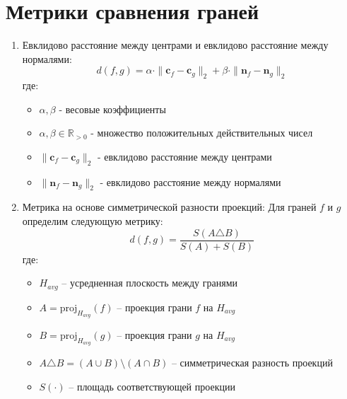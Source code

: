 \documentclass[a4paper,14pt]{extarticle}
\theoremstyle{remark} %
\begin{document}
\section{Метрики сравнения граней}
\begin{enumerate}
    \item Евклидово расстояние между центрами и евклидово расстояние между нормалями:
        \begin{equation}
            d(f,g) = \alpha \cdot \|\mathbf{c}_f - \mathbf{c}_g\|_2 + \beta \cdot \|\mathbf{n}_f - \mathbf{n}_g\|_2
        \end{equation}
        \noindent где:
        \begin{itemize}
            \item $\alpha, \beta$ - весовые коэффициенты
            \item $\alpha, \beta \in \mathbb{R}_{>0}$ - множество положительных действительных чисел
            \item $\|\mathbf{c}_f - \mathbf{c}_g\|_2$ - евклидово расстояние между центрами
            \item $\|\mathbf{n}_f - \mathbf{n}_g\|_2$ - евклидово расстояние между нормалями
        \end{itemize}

    \item Метрика на основе симметрической разности проекций:\newline
        Для граней $f$ и $g$ определим следующую метрику:
        \begin{equation}
            d(f,g) = \frac{S(A \triangle B)}{S(A) + S(B)}
        \end{equation}
        где:
        \begin{itemize}
            \item $H_{avg}$ -- усредненная плоскость между гранями

            \item $A = \text{proj}_{H_{avg}}(f)$ -- проекция грани $f$ на $H_{avg}$

            \item $B = \text{proj}_{H_{avg}}(g)$ -- проекция грани $g$ на $H_{avg}$

            \item $A \triangle B = (A \cup B) \setminus (A \cap B)$ -- симметрическая разность проекций

            \item $S(\cdot)$ -- площадь соответствующей проекции
        \end{itemize}


\end{enumerate}
\end{document}
